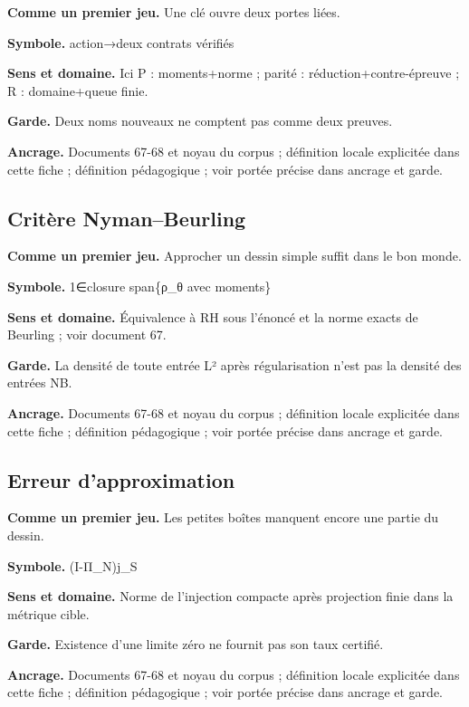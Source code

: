 \documentclass[
  9pt,
  a4paper,
]{article}
\begin{document}
\textbf{Comme un premier jeu.} Une clé ouvre deux portes liées.

\textbf{Symbole.} action→deux contrats vérifiés

\textbf{Sens et domaine.} Ici P : moments+norme ; parité :
réduction+contre-épreuve ; R : domaine+queue finie.

\textbf{Garde.} Deux noms nouveaux ne comptent pas comme deux preuves.

\textbf{Ancrage.} Documents 67-68 et noyau du corpus ; définition locale
explicitée dans cette fiche ; définition pédagogique ; voir portée
précise dans ancrage et garde.

\hypertarget{crituxe8re-nymanbeurling}{%
\subsection{Critère Nyman--Beurling}\label{crituxe8re-nymanbeurling}}

\textbf{Comme un premier jeu.} Approcher un dessin simple suffit dans le
bon monde.

\textbf{Symbole.} 1∈closure span\{ρ\_θ avec moments\}

\textbf{Sens et domaine.} Équivalence à RH sous l'énoncé et la norme
exacts de Beurling ; voir document 67.

\textbf{Garde.} La densité de toute entrée L² après régularisation n'est
pas la densité des entrées NB.

\textbf{Ancrage.} Documents 67-68 et noyau du corpus ; définition locale
explicitée dans cette fiche ; définition pédagogique ; voir portée
précise dans ancrage et garde.

\hypertarget{erreur-dapproximation}{%
\subsection{Erreur d'approximation}\label{erreur-dapproximation}}

\textbf{Comme un premier jeu.} Les petites boîtes manquent encore une
partie du dessin.

\textbf{Symbole.} \textbar\textbar(I-Π\_N)j\_S\textbar\textbar{}

\textbf{Sens et domaine.} Norme de l'injection compacte après projection
finie dans la métrique cible.

\textbf{Garde.} Existence d'une limite zéro ne fournit pas son taux
certifié.

\textbf{Ancrage.} Documents 67-68 et noyau du corpus ; définition locale
explicitée dans cette fiche ; définition pédagogique ; voir portée
précise dans ancrage et garde.
\end{document}
